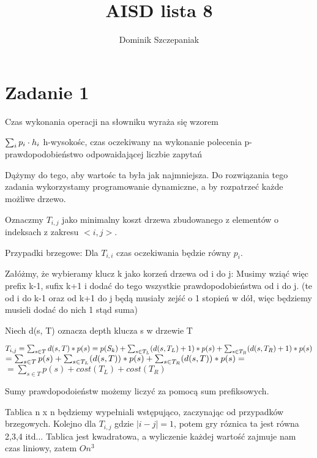 \documentclass[12pt]{article}
\title{AISD lista 8}
\author{Dominik Szczepaniak}
\begin{document}
\maketitle

\bgroup\obeylines

\section{Zadanie 1}
Czas wykonania operacji na słowniku wyraża się wzorem

$\sum_i p_i \cdot h_i\\$
h-wysokośc, czas oczekiwany na wykonanie polecenia
p-prawdopodobieństwo odpowaidającej liczbie zapytań

Dążymy do tego, aby wartośc ta była jak najmniejsza. Do rozwiązania tego zadania wykorzystamy programowanie dynamiczne, a by rozpatrzeć każde możliwe drzewo.

Oznaczmy $T_{i,j}$ jako minimalny koszt drzewa zbudowanego z elementów o indeksach z zakresu $<i,j>$.

Przypadki brzegowe: Dla $T_{i,i}$ czas oczekiwania będzie równy $p_i$.

Załóżmy, że wybieramy klucz k jako korzeń drzewa od i do j:
Musimy wziąć więc prefix k-1, sufix k+1 i dodać do tego wszystkie prawdopodobieństwa od i do j. (te od i do k-1 oraz od k+1 do j będą musiały zejść o 1 stopień w dół, więc będziemy musieli dodać do nich 1 stąd suma)

Niech d(s, T) oznacza depth klucza s w drzewie T 

$T_{i, j} = \sum_{s \in T} d(s, T) * p(s) = p(S_k) + \sum_{s \in T_L} (d(s, T_L) + 1) * p(s) + \sum_{s \in T_R}(d(s, T_R)+1) * p(s)\\$
$= \sum_{s \in T} p(s) + \sum_{s \in T_L} (d(s, T)) * p(s) + \sum_{s \in T_R} (d(s, T)) * p(s) = \\$
$=\sum_{s \in T} p(s) + cost(T_L) + cost(T_R)$



Sumy prawdopodoieństw możemy liczyć za pomocą sum prefiksowych.

Tablica n x n będziemy wypełniali wstępująco, zaczynając od przypadków brzegowych. Kolejno dla $T_{i, j}$ gdzie $|i-j| = 1$, potem gry róznica ta jest równa 2,3,4 itd...
Tablica jest kwadratowa, a wyliczenie każdej wartość zajmuje nam czas liniowy, zatem $O{n^3}$
\end{document}
